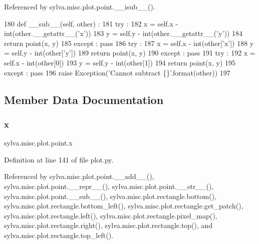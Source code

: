 Referenced by sylva.\+misc.\+plot.\+point.\+\_\+\+\_\+isub\+\_\+\+\_\+().


\begin{DoxyCode}
180     \textcolor{keyword}{def }\_\_sub\_\_(self, other) :
181       \textcolor{keywordflow}{try} :
182         x = self.x - int(other.\_\_getattr\_\_(\textcolor{stringliteral}{'x'}))
183         y = self.y - int(other.\_\_getattr\_\_(\textcolor{stringliteral}{'y'}))
184         \textcolor{keywordflow}{return} point(x, y)
185       \textcolor{keywordflow}{except} : \textcolor{keywordflow}{pass}
186       \textcolor{keywordflow}{try} :
187         x = self.x - int(other[\textcolor{stringliteral}{'x'}])
188         y = self.y - int(other[\textcolor{stringliteral}{'y'}])
189         \textcolor{keywordflow}{return} point(x, y)
190       \textcolor{keywordflow}{except} : \textcolor{keywordflow}{pass}
191       \textcolor{keywordflow}{try} :
192         x = self.x - int(other[0])
193         y = self.y - int(other[1])
194         \textcolor{keywordflow}{return} point(x, y)
195       \textcolor{keywordflow}{except} : \textcolor{keywordflow}{pass}
196       \textcolor{keywordflow}{raise} Exception(\textcolor{stringliteral}{'Cannot subtract \{\}'}.format(other))
197 
\end{DoxyCode}


\subsection{Member Data Documentation}
\mbox{\label{classsylva_1_1misc_1_1plot_1_1point_a268ceb8acaa96e215d84447421cbadc0}} 
\subsubsection{\texorpdfstring{x}{x}}
{\footnotesize\ttfamily sylva.\+misc.\+plot.\+point.\+x}



Definition at line 141 of file plot.\+py.



Referenced by sylva.\+misc.\+plot.\+point.\+\_\+\+\_\+add\+\_\+\+\_\+(), sylva.\+misc.\+plot.\+point.\+\_\+\+\_\+repr\+\_\+\+\_\+(), sylva.\+misc.\+plot.\+point.\+\_\+\+\_\+str\+\_\+\+\_\+(), sylva.\+misc.\+plot.\+point.\+\_\+\+\_\+sub\+\_\+\+\_\+(), sylva.\+misc.\+plot.\+rectangle.\+bottom(), sylva.\+misc.\+plot.\+rectangle.\+bottom\+\_\+left(), sylva.\+misc.\+plot.\+rectangle.\+get\+\_\+patch(), sylva.\+misc.\+plot.\+rectangle.\+left(), sylva.\+misc.\+plot.\+rectangle.\+pixel\+\_\+map(), sylva.\+misc.\+plot.\+rectangle.\+right(), sylva.\+misc.\+plot.\+rectangle.\+top(), and sylva.\+misc.\+plot.\+rectangle.\+top\+\_\+left().

